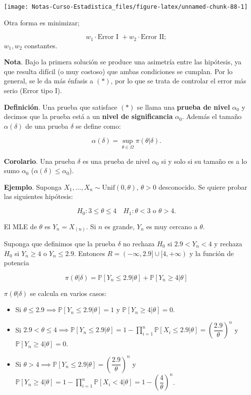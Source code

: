 \documentclass[
  12pt,
]{book}
\begin{document}
\begin{center}\texttt{[image: Notas-Curso-Estadistica\_files/figure-latex/unnamed-chunk-88-1]} \end{center}

Otra forma es minimizar;

\[w_1\cdot\text{Error I } + w_2\cdot\text{Error II};\]
\(w_1,w_2\) constantes.

\textbf{Nota}. Bajo la primera solución se produce una asimetría entre las hipótesis,
ya que resulta difícil (o muy costoso) que ambas condiciones se cumplan. Por lo
general, se le da más énfasis a \((*)\), por lo que se trata de controlar el error
más serio (Error tipo I).

\textbf{Definición}. Una prueba que satisface \((*)\) se llama una \textbf{prueba de nivel}
\(\alpha_0\) y decimos que la prueba está a un \textbf{nivel de significancia}
\(\alpha_0\). Además el tamaño \(\alpha(\delta)\) de una prueba \(\delta\) se define
como:

\[\alpha(\delta) = \sup_{\theta\in\Omega}\pi(\theta|\delta).\]

\textbf{Corolario}. Una prueba \(\delta\) es una prueba de nivel \(\alpha_0\) si y solo
si su tamaño es a lo sumo \(\alpha_0\) (\(\alpha(\delta)\leq\alpha_0\)).

\textbf{Ejemplo}. Suponga \(X_1,\dots,X_n\sim \text{Unif}(0,\theta)\), \(\theta>0\)
desconocido. Se quiere probar las siguientes hipótesis:

\[H_0: 3\leq\theta\leq 4 \quad H_1:\theta<3 \text{ o }\theta>4. \]

El MLE de \(\theta\) es \(Y_n = X_{(n)}\). Si \(n\) es grande, \(Y_n\) es muy cercano a
\(\theta\).

Suponga que definimos que la prueba \(\delta\) no rechaza \(H_0\) si \(2.9<Y_n<4\) y
rechaza \(H_0\) si \(Y_n\geq4\) o \(Y_n\leq2.9\). Entonces \(R = (-\infty, 2.9] \cup [4,+\infty)\) y la función de potencia

\[
\pi(\theta|\delta) = \mathbb P[Y_n\leq
2.9|\theta]+\mathbb P[Y_n\geq4|\theta] 
\]

\(\pi(\theta|\delta)\) se calcula en varios casos:

\begin{itemize}
\item
  Si \(\theta\leq 2.9 \implies \mathbb P[Y_n\leq 2.9|\theta] = 1\) y
  \(\mathbb P[Y_n\geq4|\theta] = 0\).
\item
  Si \(2.9<\theta\leq4 \implies \mathbb P[Y_n\leq 2.9|\theta] = 1 - \prod_{i=1}^n \mathbb P[X_i\leq2.9|\theta] = \left(\dfrac{2.9}{\theta}\right)^n\) y \(\mathbb P[Y_n\geq4|\theta] = 0\).
\item
  Si \(\theta>4 \implies \mathbb P[Y_n\leq 2.9|\theta] = \left(\dfrac{2.9}{\theta}\right)^n\) y \(\mathbb P[Y_n\geq 4|\theta] = 1 - \displaystyle\prod_{i=1}^n \mathbb P[X_i<4|\theta] = 1-\left(\dfrac 4\theta\right)^n\).
\end{itemize}
\end{document}

